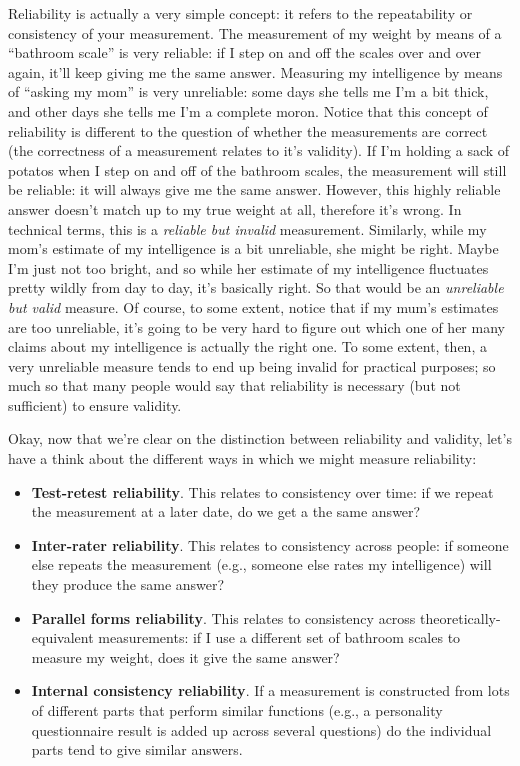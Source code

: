 \documentclass[
]{book}
\begin{document}
Reliability is actually a very simple concept: it refers to the repeatability or consistency of your measurement. The measurement of my weight by means of a ``bathroom scale'' is very reliable: if I step on and off the scales over and over again, it'll keep giving me the same answer. Measuring my intelligence by means of ``asking my mom'' is very unreliable: some days she tells me I'm a bit thick, and other days she tells me I'm a complete moron. Notice that this concept of reliability is different to the question of whether the measurements are correct (the correctness of a measurement relates to it's validity). If I'm holding a sack of potatos when I step on and off of the bathroom scales, the measurement will still be reliable: it will always give me the same answer. However, this highly reliable answer doesn't match up to my true weight at all, therefore it's wrong. In technical terms, this is a {\emph{reliable but invalid}} measurement. Similarly, while my mom's estimate of my intelligence is a bit unreliable, she might be right. Maybe I'm just not too bright, and so while her estimate of my intelligence fluctuates pretty wildly from day to day, it's basically right. So that would be an {\emph{unreliable but valid}} measure. Of course, to some extent, notice that if my mum's estimates are too unreliable, it's going to be very hard to figure out which one of her many claims about my intelligence is actually the right one. To some extent, then, a very unreliable measure tends to end up being invalid for practical purposes; so much so that many people would say that reliability is necessary (but not sufficient) to ensure validity.

Okay, now that we're clear on the distinction between reliability and validity, let's have a think about the different ways in which we might measure reliability:

\begin{itemize}
\item
  \textbf{Test-retest reliability}. This relates to consistency over time: if we repeat the measurement at a later date, do we get a the same answer?
\item
  \textbf{Inter-rater reliability}. This relates to consistency across people: if someone else repeats the measurement (e.g., someone else rates my intelligence) will they produce the same answer?
\item
  \textbf{Parallel forms reliability}. This relates to consistency across theoretically-equivalent measurements: if I use a different set of bathroom scales to measure my weight, does it give the same answer?
\item
  \textbf{Internal consistency reliability}. If a measurement is constructed from lots of different parts that perform similar functions (e.g., a personality questionnaire result is added up across several questions) do the individual parts tend to give similar answers.
\end{itemize}
\end{document}
